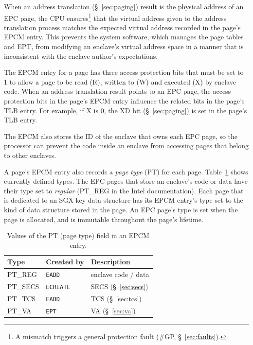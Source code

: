 When an address translation (\S~\ref{sec:paging}) result is the physical
address of an EPC page, the CPU ensures\footnote{A mismatch triggers a general
protection fault (\#GP, \S~\ref{sec:faults}).} that the virtual address given
to the address translation process matches the expected virtual address
recorded in the page's EPCM entry.  This prevents the system software, which
manages the page tables and EPT, from modifying an enclave's virtual address
space in a manner that is inconsistent with the enclave author's expectations.


The EPCM entry for a page has three access protection bits that must be set to
1 to allow a page to be read (R), written to (W) and executed (X) by enclave
code. When an address translation result points to an EPC page, the access
protection bits in the page's EPCM entry influence the related bits in the
page's TLB entry. For example, if X is 0, the XD bit (\S~\ref{sec:paging}) is
set in the page's TLB entry.

The EPCM also stores the ID of the enclave that owns each EPC page, so the
processor can prevent the code inside an enclave from accessing pages that
belong to other enclaves.

A page's EPCM entry also records a \textit{page type} (PT) for each page.
Table~\ref{fig:pt_values} shows currently defined types. The EPC pages that
store an enclave's code or data have their type set to \textit{regular}
(PT\_REG in the Intel documentation). Each page that is dedicated to an SGX key
data structure has its EPCM entry's type set to the kind of data structure
stored in the page. An EPC page's type is set when the page is allocated, and
is immutable throughout the page's lifetime.

\begin{table}[hbt]
  \centering
  \begin{tabularx}{\columnwidth}{| l | l | X |}
  \hline
  \textbf{Type} & \textbf{Created by} & \textbf{Description}\\
  \hline
  PT\_REG & \texttt{EADD} & enclave code / data \\
  \hline
  PT\_SECS & \texttt{ECREATE} & SECS (\S~\ref{sec:secs}) \\
  \hline
  PT\_TCS & \texttt{EADD} & TCS (\S~\ref{sec:tcs}) \\
  \hline
  PT\_VA & \texttt{EPT} & VA (\S~\ref{sec:va}) \\
  \hline
  \end{tabularx}
  \caption{Values of the PT (page type) field in an EPCM entry.}
  \label{fig:pt_values}
\end{table}


